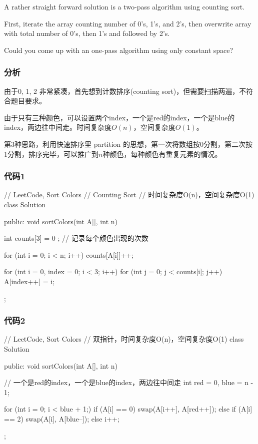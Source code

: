 A rather straight forward solution is a two-pass algorithm using counting sort.

First, iterate the array counting number of 0's, 1's, and 2's, then overwrite array with total number of 0's, then 1's and followed by 2's.

Could you come up with an one-pass algorithm using only constant space?


\subsubsection{分析}
由于0, 1, 2 非常紧凑，首先想到计数排序(counting sort)，但需要扫描两遍，不符合题目要求。

由于只有三种颜色，可以设置两个index，一个是red的index，一个是blue的index，两边往中间走。时间复杂度$O(n)$，空间复杂度$O(1)$。

第3种思路，利用快速排序里 partition 的思想，第一次将数组按0分割，第二次按1分割，排序完毕，可以推广到$n$种颜色，每种颜色有重复元素的情况。


\subsubsection{代码1}
\begin{Code}
	// LeetCode, Sort Colors
	// Counting Sort
	// 时间复杂度O(n)，空间复杂度O(1)
	class Solution {
		public:
		void sortColors(int A[], int n) {
			int counts[3] = { 0 }; // 记录每个颜色出现的次数
			
			for (int i = 0; i < n; i++)
			counts[A[i]]++;
			
			for (int i = 0, index = 0; i < 3; i++)
			for (int j = 0; j < counts[i]; j++)
			A[index++] = i;
			
		}
	};
\end{Code}


\subsubsection{代码2}
\begin{Code}
	// LeetCode, Sort Colors
	// 双指针，时间复杂度O(n)，空间复杂度O(1)
	class Solution {
		public:
		void sortColors(int A[], int n) {
			// 一个是red的index，一个是blue的index，两边往中间走
			int red = 0, blue = n - 1;
			
			for (int i = 0; i < blue + 1;) {
				if (A[i] == 0)
				swap(A[i++], A[red++]);
				else if (A[i] == 2)
				swap(A[i], A[blue--]);
				else
				i++;
			}
		}
	};
\end{Code}


